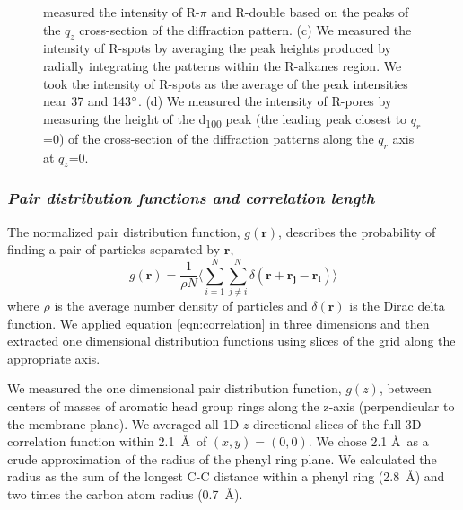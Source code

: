 \documentclass[journal=jpcbfk,manuscript=article]{achemso}
\begin{document}
\begin{figure}[!htb]
{  measured the intensity of R-$\pi$ and R-double based on the peaks of the $q_z$
  cross-section of the diffraction pattern. (c) We measured the intensity of R-spots
  by averaging the peak heights produced by radially integrating the patterns within 
  the R-alkanes region. We took the intensity of R-spots as the average of the 
  peak intensities near 37 and 143$\degree$. (d) We measured the intensity of 
  R-pores by measuring the height of the d\textsubscript{100} peak (the leading
  peak closest to $q_r$=0) of the cross-section of the diffraction patterns along
  the $q_r$ axis at $q_z$=0.} \label{fig:xrd_intensities}
  \end{figure}
 
  \subsubsection{\textit{Pair distribution functions and correlation length}}\label{section:correlation_length}

  The normalized pair distribution function, $g(\mathbf{r})$, describes
  the probability of finding a pair of particles separated by $\mathbf{r}$,
  \begin{equation}
	g(\mathbf{r})= \frac{1}{\rho N} \Bigg \langle \sum_{i=1}^{N}\sum_{j\neq i}^{N} \delta(\mathbf{r}+\mathbf{r_j}-\mathbf{r_i}) \Bigg \rangle
	\label{eqn:correlation}
  \end{equation}
  where $\rho$ is the average number density of particles and
  $\delta(\mathbf{r})$ is the Dirac delta function\cite{kuriabova_linear_2010}.
  We applied equation \ref{eqn:correlation} in three dimensions and then
  extracted one dimensional distribution functions using slices of the grid
  along the appropriate axis.

  We measured the one dimensional pair distribution function, $g(z)$, between centers 
  of masses of aromatic head group rings along the z-axis (perpendicular to
  the membrane plane). We averaged all 1D $z$-directional slices of the full 3D 
  correlation function within 2.1~\AA~of $(x, y)=(0, 0)$. We chose 2.1 \AA~as a crude 
  approximation of the radius of the phenyl ring plane. 
  We calculated the radius as the sum of the longest C-C distance within a phenyl 
  ring (2.8~\AA) and two times the carbon atom radius (0.7~\AA). %
  
\end{document}
